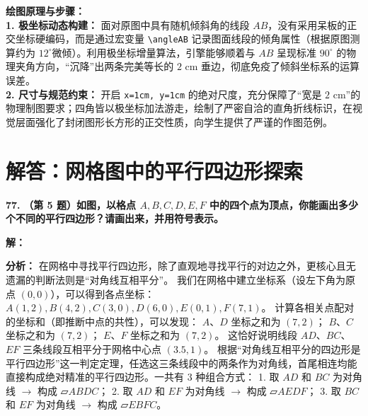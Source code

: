 \vspace{0.4cm}
{\small\color{blue!70!black}
\textbf{绘图原理与步骤：}\\
\textbf{1. 极坐标动态构建：} 面对原图中具有随机倾斜角的线段 $AB$，没有采用呆板的正交坐标硬编码，而是通过宏变量 \texttt{\textbackslash angleAB} 记录图面线段的倾角属性（根据原图测算约为 $12^\circ$微倾）。利用极坐标增量算法，引擎能够顺着与 $AB$ 呈现标准 $90^\circ$ 的物理夹角方向，“沉降”出两条完美等长的 $2\text{ cm}$ 垂边，彻底免疫了倾斜坐标系的运算误差。\\
\textbf{2. 尺寸与规范约束：} 开启 \texttt{x=1cm, y=1cm} 的绝对尺度，充分保障了“宽是 $2\text{ cm}$”的物理制图要求；四角皆以极坐标加法游走，绘制了严密自洽的直角折线标识，在视觉层面强化了封闭图形长方形的正交性质，向学生提供了严谨的作图范例。
}

\newpage



\newpage

\section{解答：网格图中的平行四边形探索}

\vspace{0.6cm}

\textbf{\LARGE 77.} \textbf{（第 5 题）如图，以格点 $A, B, C, D, E, F$ 中的四个点为顶点，你能画出多少个不同的平行四边形？请画出来，并用符号表示。}

\vspace{0.4cm}
\textbf{解：}

\textbf{分析：} 在网格中寻找平行四边形，除了直观地寻找平行的对边之外，更核心且无遗漏的判断法则是“对角线互相平分”。
我们在网格中建立坐标系（设左下角为原点 $(0,0)$），可以得到各点坐标：
$A(1,2), B(4,2), C(3,0), D(6,0), E(0,1), F(7,1)$。
计算各相关点配对的坐标和（即推断中点的共性），可以发现：
$A、D$ 坐标之和为 $(7,2)$；
$B、C$ 坐标之和为 $(7,2)$；
$E、F$ 坐标之和为 $(7,2)$。
这恰好说明线段 $AD$、$BC$、$EF$ 三条线段互相平分于网格中心点 $(3.5, 1)$。
根据“对角线互相平分的四边形是平行四边形”这一判定定理，任选这三条线段中的两条作为对角线，首尾相连均能直接构成绝对精准的平行四边形。一共有 $3$ 种组合方式：
1. 取 $AD$ 和 $BC$ 为对角线 $\to$ 构成 $\mathord{▱} ABDC$；
2. 取 $AD$ 和 $EF$ 为对角线 $\to$ 构成 $\mathord{▱} AEDF$；
3. 取 $BC$ 和 $EF$ 为对角线 $\to$ 构成 $\mathord{▱} EBFC$。

